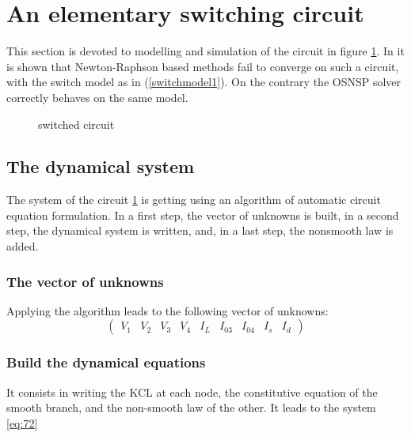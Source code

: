 \documentclass{article}
\begin{document}
\section{An elementary switching circuit}
\label{section3}


This section is devoted to modelling and simulation of the circuit in figure \ref{fig:figcircuit1}. In \cite{maffezzoni2006} it is shown that Newton-Raphson based methods fail to converge on such a circuit, with the switch model as in (\ref{switchmodel1}). On the contrary the OSNSP solver correctly behaves on the same model.  

\begin{figure}[h]
  \centering
   \scalebox{0.9}{
  
  }
  \caption{switched circuit}
  \label{fig:figcircuit1}
\end{figure}

\subsection{The dynamical system}
\label{section31}
The system of the circuit \ref{fig:figcircuit1} is getting using an algorithm of automatic circuit equation formulation.
In a first step, the vector of unknowns is built, in a second step, the dynamical system is
written, and, in a last step, the nonsmooth law is added.

\subsubsection{The vector of unknowns}
Applying the algorithm leads to the following vector of unknowns:
\[\left(\begin{array}{ccccccccc}
V_1&V_2&V_3&V_4&I_L&I_{03}&I_{04}&I_s&I_d
\end{array}\right)\]
\subsubsection{Build the dynamical equations}
It consists in writing the KCL at each node, the constitutive equation of the smooth branch, and the
non-smooth law of the other. It leads to the  system \ref{eq:72}
\end{document}
